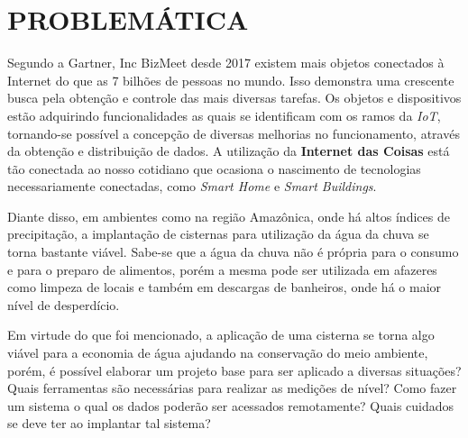 
\chapter{PROBLEMÁTICA}
\label{chap:problematica}

Segundo a Gartner, Inc BizMeet \cite{BizMeet} desde 2017 existem mais objetos conectados à Internet do que as 7 bilhões de pessoas no mundo. Isso demonstra uma crescente busca pela obtenção e controle das mais diversas tarefas. Os objetos e dispositivos estão adquirindo funcionalidades as quais se identificam com os ramos da \textit{IoT}, tornando-se possível a concepção de diversas melhorias no funcionamento, através da obtenção e distribuição de dados.  A utilização da \textbf{Internet das Coisas} está tão conectada ao nosso cotidiano que ocasiona o nascimento de tecnologias necessariamente conectadas, como \textit{Smart Home} e \textit{Smart Buildings}. 

Diante disso, em ambientes como na região Amazônica, onde há altos índices de precipitação, a implantação de cisternas para utilização da água da chuva se torna bastante viável. Sabe-se que a água da chuva não é própria para o consumo e para o preparo de alimentos, porém a mesma pode ser utilizada em afazeres como limpeza de locais e também em descargas de banheiros, onde há o maior nível de desperdício.

Em virtude do que foi mencionado,  a aplicação de uma cisterna se torna algo viável para a economia de água ajudando na conservação do meio ambiente, porém, é possível elaborar um projeto base para ser aplicado a diversas situações? Quais ferramentas são necessárias para realizar as medições de nível? Como fazer um sistema o qual os dados poderão ser acessados remotamente? Quais cuidados se deve ter ao implantar tal sistema?
